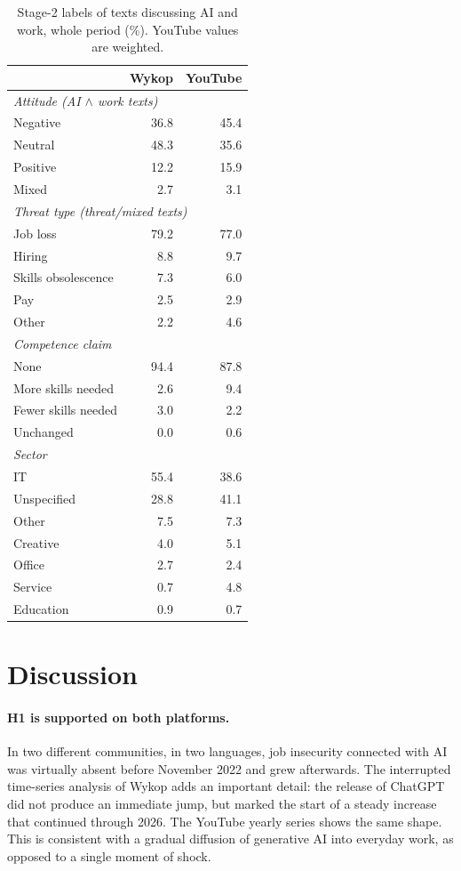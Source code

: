 \documentclass[11pt]{article}
\begin{document}
\begin{table}[t]
\centering\small
\begin{tabular}{lrr}
\toprule
 & Wykop & YouTube \\
\midrule
\multicolumn{3}{l}{\emph{Attitude (AI $\wedge$ work texts)}} \\
Negative & 36.8 & 45.4 \\
Neutral & 48.3 & 35.6 \\
Positive & 12.2 & 15.9 \\
Mixed & 2.7 & 3.1 \\
\midrule
\multicolumn{3}{l}{\emph{Threat type (threat/mixed texts)}} \\
Job loss & 79.2 & 77.0 \\
Hiring & 8.8 & 9.7 \\
Skills obsolescence & 7.3 & 6.0 \\
Pay & 2.5 & 2.9 \\
Other & 2.2 & 4.6 \\
\midrule
\multicolumn{3}{l}{\emph{Competence claim}} \\
None & 94.4 & 87.8 \\
More skills needed & 2.6 & 9.4 \\
Fewer skills needed & 3.0 & 2.2 \\
Unchanged & 0.0 & 0.6 \\
\midrule
\multicolumn{3}{l}{\emph{Sector}} \\
IT & 55.4 & 38.6 \\
Unspecified & 28.8 & 41.1 \\
Other & 7.5 & 7.3 \\
Creative & 4.0 & 5.1 \\
Office & 2.7 & 2.4 \\
Service & 0.7 & 4.8 \\
Education & 0.9 & 0.7 \\
\bottomrule
\end{tabular}
\caption{Stage-2 labels of texts discussing AI and work, whole period (\%).
YouTube values are weighted.}
\label{tab:stage2-compare}
\end{table}






\section{Discussion}
\label{sec:discussion}

\paragraph{H1 is supported on both platforms.} In two different communities,
in two languages, job insecurity connected with AI was virtually absent before
November 2022 and grew afterwards. The interrupted time-series analysis of Wykop
adds an important detail: the release of ChatGPT did not produce an immediate
jump, but marked the start of a steady increase that continued through 2026.
The YouTube yearly series shows the same shape. This is consistent with a
gradual diffusion of generative AI into everyday work, as opposed to a single
moment of shock.
\end{document}
